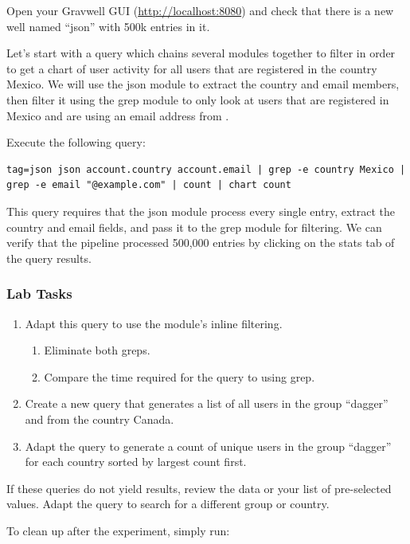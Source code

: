 Open your Gravwell GUI (\href{http://localhost:8080}{http://localhost:8080}) and check
that there is a new well named ``json'' with 500k entries in it.

Let's start with a query which chains several modules together to
filter in order to get a chart of user activity for all users that are
registered in the country Mexico. We will use the json module to
extract the country and email members, then filter it using the grep
module to only look at users that are registered in Mexico and are using
an email address from .

Execute the following query:

\begin{Verbatim}[breaklines=true]
tag=json json account.country account.email | grep -e country Mexico |
grep -e email "@example.com" | count | chart count
\end{Verbatim}

This query requires that the json module process every single entry,
extract the country and email fields, and pass it to the grep module
for filtering. We can verify that the pipeline processed 500,000
entries by clicking on the stats tab of the query results.

\subsubsection{Lab Tasks}

\begin{enumerate}
\item
  Adapt this query to use the  module's inline filtering.
	\begin{enumerate}
	\item Eliminate both greps.
	\item Compare the time required for the query to using grep.
	\end{enumerate}
\item
  Create a new query that generates a list of all users in the group
  ``dagger'' and from the country Canada.
\item
  Adapt the query to generate a count of unique users in the
  group ``dagger'' for each country sorted by largest count first.
\end{enumerate}

If these queries do not yield results, review the data or your list
of pre-selected values. Adapt the query to search for a different group or country.

To clean up after the experiment, simply run:

